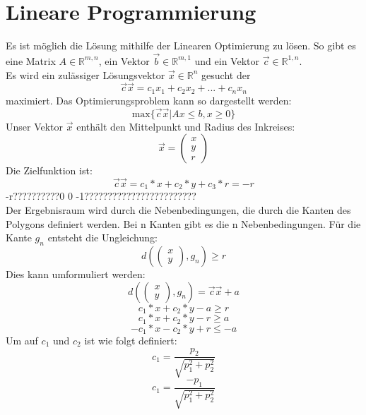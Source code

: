 \documentclass[conference]{IEEEtran}
\begin{document}
	\section{Lineare Programmierung}
	Es ist möglich die Lösung mithilfe der Linearen Optimierung zu lösen. So gibt es eine Matrix $A \in \mathbb{R}^{m,n}$, ein Vektor $\vec{b} \in \mathbb{R}^{m,1}$ und ein Vektor $\vec{c} \in \mathbb{R}^{1,n}$.\\
	Es wird ein zulässiger Lösungsvektor $\vec{x} \in \mathbb{R}^{n}$ gesucht der
	\[ \vec{c}\vec{x} = c_1x_1 + c_2x_2+ ... + c_nx_n \]
	maximiert.
	Das Optimierungsproblem kann so dargestellt werden:
	\[ \text{max}\{\vec{c}\vec{x} | Ax \leq b, x \geq 0\} \]
	\cite{b2}
	Unser Vektor $\vec{x}$ enthält den Mittelpunkt und Radius des Inkreises:
	\[ \vec{x} = \left(\begin{array}{c}x\\y\\r\end{array}\right) \]
	Die Zielfunktion ist:
	\[ \vec{c}\vec{x} = c_1*x+c_2*y+c_3*r = -r \]
	-r??????????0 0 -1????????????????????????\\
	Der Ergebnisraum wird durch die Nebenbedingungen, die durch die Kanten des Polygons definiert werden. Bei n Kanten gibt es die n Nebenbedingungen. Für die Kante $g_n$ entsteht die Ungleichung:
	\[ d(\left(\begin{array}{c}x\\y\end{array}\right), g_n) \geq r \]
	Dies kann umformuliert werden:
	\[ d(\left(\begin{array}{c}x\\y\end{array}\right), g_n) = \vec{c}\vec{x}+a \]
	\[ c_1 *x + c_2 *y - a \geq r \]
	\[ c_1 *x + c_2 *y - r \geq a \]
	\[ -c_1 *x - c_2 *y + r \leq -a \]
	Um auf $c_1$ und $c_2$ ist wie folgt definiert:\\
	
	\[ c_1 = \frac{p_2}{\sqrt{p_1^2+p_2^2}} \]
	\[ c_1 = \frac{-p_1}{\sqrt{p_1^2+p_2^2}} \]
	
\end{document}
